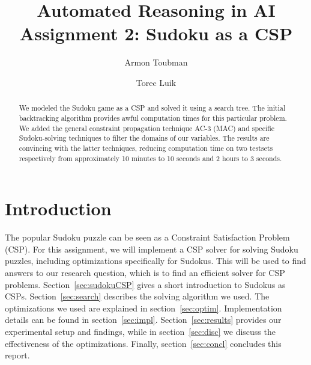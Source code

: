 \documentclass[11pt]{article} %
\title{Automated Reasoning in AI\\
Assignment 2: Sudoku as a CSP}
\author{Armon Toubman \and Torec Luik}
\begin{document}
\maketitle

\begin{abstract}
We modeled the Sudoku game as a CSP and solved it using a search tree. The initial backtracking algorithm provides awful computation times for this particular problem. We added the general constraint propagation technique AC-3 (MAC) and specific Sudoku-solving techniques to filter the domains of our variables. The results are convincing with the latter techniques, reducing computation time on two testsets respectively from approximately 10 minutes to 10 seconds and 2 hours to 3 seconds.
\end{abstract}

\section{Introduction}
\label{sec:intro}
The popular Sudoku puzzle can be seen as a Constraint Satisfaction Problem (CSP). For this assignment, we will implement a CSP solver for solving Sudoku puzzles, including optimizations specifically for Sudokus. This will be used to find answers to our research question, which is to find an efficient solver for CSP problems. Section~\ref{sec:sudokuCSP} gives a short introduction to Sudokus as CSPs. Section~\ref{sec:search} describes the solving algorithm we used. The optimizations we used are explained in section~\ref{sec:optim}. Implementation details can be found in section~\ref{sec:impl}. Section~\ref{sec:results} provides our experimental setup and findings, while in section~\ref{sec:disc} we discuss the effectiveness of the optimizations. Finally, section~\ref{sec:concl} concludes this report.

\begin{table}[htbp]
\caption{An example Sudoku from one of our testsets.}
    \label{tab:sudoku_initial}
    \begin{center}
    \end{center}
\end{table}
\end{document}
